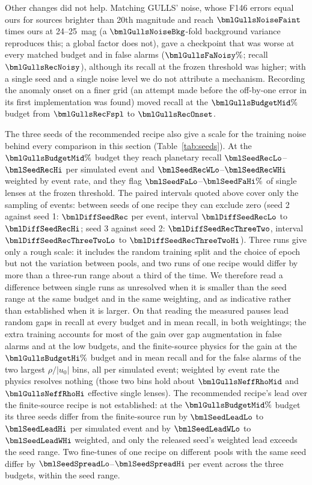 Other changes did not help. Matching GULLS' noise, whose F146 errors equal ours for
sources brighter than 20th magnitude and reach $\bmlGullsNoiseFaint$ times ours at 24--25~mag (a
$\bmlGullsNoiseBkg$-fold background variance reproduces this; a global factor does not), gave a
checkpoint that was worse at every matched budget and in false alarms ($\bmlGullsFaNoisy\%$; recall
$\bmlGullsRecNoisy$), although its recall at the frozen threshold was higher; with a single seed and a
single noise level we do not attribute a mechanism. Recording the anomaly onset on a finer grid (an
attempt made before the off-by-one error in its first implementation was found) moved recall at the
$\bmlGullsBudgetMid\%$ budget from $\bmlGullsRecFspl$ to $\bmlGullsRecOnset$.

The three seeds of the recommended recipe also give a scale for the training noise behind every
comparison in this section (Table~\ref{tab:seeds}). At the $\bmlGullsBudgetMid\%$ budget they reach
planetary recall $\bmlSeedRecLo$--$\bmlSeedRecHi$ per simulated event and $\bmlSeedRecWLo$--$\bmlSeedRecWHi$
weighted by event rate, and they flag $\bmlSeedFaLo$--$\bmlSeedFaHi\%$ of single lenses at the frozen
threshold. The paired intervals quoted above cover only the sampling of events: between seeds of one
recipe they can exclude zero (seed 2 against seed 1: $\bmlDiffSeedRec$ per event, interval
$\bmlDiffSeedRecLo$ to $\bmlDiffSeedRecHi$; seed 3 against seed 2: $\bmlDiffSeedRecThreeTwo$, interval
$\bmlDiffSeedRecThreeTwoLo$ to $\bmlDiffSeedRecThreeTwoHi$). Three runs give only a rough scale: it includes
the random training split and the choice of epoch but not the variation between pools, and two runs of one
recipe would differ by more than a three-run range about a third of the time. We therefore read a
difference between single runs as unresolved when it is smaller than the seed range at the same budget and
in the same weighting, and as indicative rather than established when it is larger. On that reading the
measured pauses lead random gaps in recall at every budget and in mean recall, in both weightings; the extra
training accounts for most of the gain over gap augmentation in false alarms and at the low budgets, and the
finite-source physics for the gain at the $\bmlGullsBudgetHi\%$ budget and in mean recall and for the false
alarms of the two largest $\rho/|u_0|$ bins, all per simulated event; weighted by event rate the physics
resolves nothing (those two bins hold about $\bmlGullsNeffRhoMid$ and $\bmlGullsNeffRhoHi$ effective single
lenses). The recommended recipe's lead over the finite-source recipe is not established: at the
$\bmlGullsBudgetMid\%$ budget its three seeds differ from the finite-source run by $\bmlSeedLeadLo$ to
$\bmlSeedLeadHi$ per simulated event and by $\bmlSeedLeadWLo$ to $\bmlSeedLeadWHi$ weighted, and only the
released seed's weighted lead exceeds the seed range. Two fine-tunes of one recipe on different pools
with the same seed differ by $\bmlSeedSpreadLo$--$\bmlSeedSpreadHi$ per event across the three budgets,
within the seed range.

